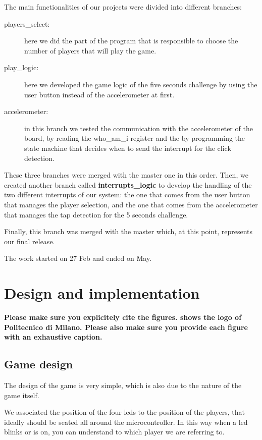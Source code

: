 The main functionalities of our projects were divided into different branches:
\begin{description}
  \item [players\_select:] here we did the part of the program that is
    responsible to choose the number of players that will play the game.
  \item [play\_logic:] here we developed the game logic of the five seconds
    challenge by using the user button instead of the accelerometer at first.
  \item [accelerometer:] in this branch we tested the communication with the
    accelerometer of the board, by reading the who\_am\_i register and the by
    programming the state machine that decides when to send the interrupt for
    the click detection.
\end{description}

These three branches were merged with the master one in this order. Then, we
created another branch called \textbf{interrupts\_logic} to develop the handling of the two different interrupts
of our system: the one that comes from the user button that manages the player
selection, and the one that comes from the accelerometer that manages the tap
detection for the 5 seconds challenge.

Finally, this branch was merged with the master which, at this point, represents our final release.

The work started on 27 Feb and ended on May.

\pagebreak

\section{Design and implementation}
\textbf{Please make sure you explicitely cite the figures.
 shows the logo of Politecnico di Milano.
Please also make sure you provide each figure with an exhaustive caption.}

\subsection{Game design}
The design of the game is very simple, which is also due to the nature of the game itself.

We associated the position of the four leds to the position of the players, that
ideally should be seated all around the microcontroller.
In this way when a led blinks or is on, you can understand to which player we
are referring to.

